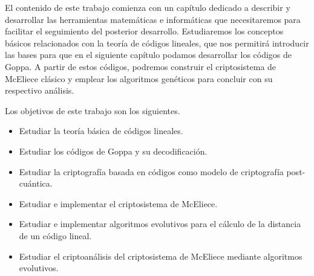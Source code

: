 
El contenido de este trabajo comienza con un capítulo dedicado a describir y desarrollar las herramientas matemáticas e informáticas que necesitaremos para facilitar el seguimiento del posterior desarrollo. Estudiaremos los conceptos básicos relacionados con la teoría de códigos lineales, que nos permitirá introducir las bases para que en el siguiente capítulo podamos desarrollar los códigos de Goppa. A partir de estos códigos, podremos construir el criptosistema de McEliece clásico y emplear los algoritmos genéticos para concluir con su respectivo análisis.


Los objetivos de este trabajo son los siguientes.

\begin{itemize}
    \item Estudiar la teoría básica de códigos lineales.
    \item Estudiar los códigos de Goppa y su decodificación.
    \item Estudiar la criptografía basada en códigos como modelo de criptografía post-cuántica.
    \item Estudiar e implementar el criptosistema de McEliece.
    \item Estudiar e implementar algoritmos evolutivos para el cálculo de la distancia de un código lineal.
    \item Estudiar el criptoanálisis del criptosistema de McEliece mediante algoritmos evolutivos.
\end{itemize}